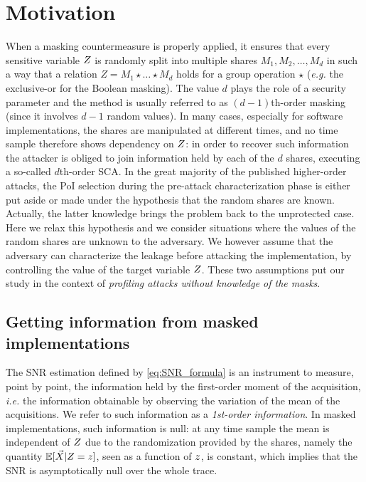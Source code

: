 \section{Motivation}
When a masking countermeasure is properly applied, it ensures that every sensitive variable $Z$  is randomly split  into multiple shares $M_1,M_2,\dots,M_d$ in such a way that a relation $Z = M_1 \star \dots \star M_d$ holds for a group operation $\star$ (\emph{e.g.} the exclusive-or for the Boolean masking). The value $d$ plays the role of a security parameter and the method is usually referred to as $(d-1)$th-order masking (since it involves $d-1$ random values). In many cases, especially for software implementations, the shares are manipulated at different times, and no time sample therefore shows dependency on $Z$: in order to recover such  information the attacker is obliged to join information held by each of the $d$ shares, executing a so-called $d$th-order SCA. In the great majority of the published higher-order attacks, the PoI selection during the pre-attack characterization phase is either put aside or made  under the hypothesis that the random shares are known. Actually, the latter knowledge brings the problem back to the unprotected case. 
Here we relax this hypothesis and we consider  situations where the values of the random shares are unknown to the adversary. We however assume that the adversary can characterize the leakage before attacking the implementation, by controlling the value of the target variable $Z$. These two assumptions put our study in the context of {\em profiling attacks without knowledge of the masks}. \\

\subsection{Getting information from masked implementations}\label{sec:HO}
The SNR estimation defined by \eqref{eq:SNR_formula} is an instrument to measure, point by point, the information held by the first-order moment of the acquisition, \emph{i.e.} the information obtainable by observing the variation of the mean of the acquisitions. We refer to such information as a \emph{1st-order information}. In masked implementations, such information is null: at any time sample the mean is independent of $Z$ due to the randomization provided by the shares, namely the quantity $\mathbb{E}[\vec{X}\vert Z=z]$, seen as a function of $z$, is constant, which implies that the SNR is asymptotically  null over the whole trace.\\
 
